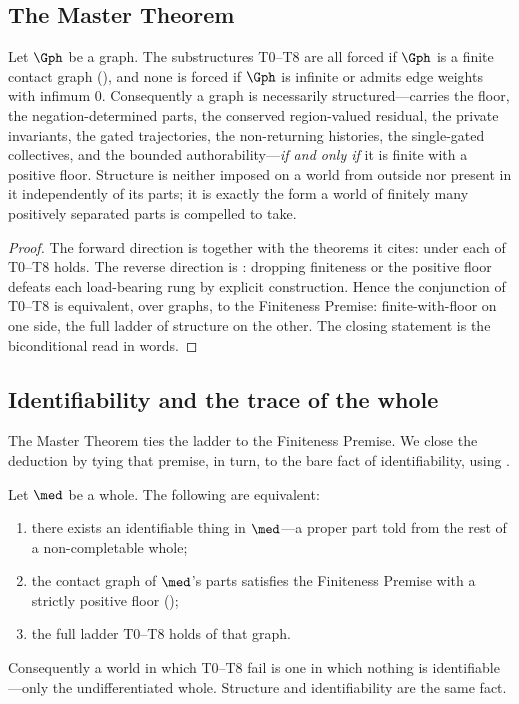 \subsection{The Master Theorem}

\begin{theorem}
\label{thm:master}
Let $\Gph$ be a graph. The substructures T0--T8 are all forced if $\Gph$ is a
finite contact graph \textup{(}\textup{)}, and none is forced if
$\Gph$ is infinite or admits edge weights with infimum $0$. Consequently a graph
is necessarily structured---carries the floor, the negation-determined parts, the
conserved region-valued residual, the private invariants, the gated trajectories,
the non-returning histories, the single-gated collectives, and the bounded
authorability---\emph{if and only if} it is finite with a positive floor. Structure
is neither imposed on a world from outside nor present in it independently of its
parts; it is exactly the form a world of finitely many positively separated parts
is compelled to take.
\end{theorem}

\begin{proof}
The forward direction is  together with the theorems it
cites: under  each of T0--T8 holds. The reverse direction is
: dropping finiteness or the positive floor defeats each
load-bearing rung by explicit construction. Hence the conjunction of T0--T8 is
equivalent, over graphs, to the Finiteness Premise: finite-with-floor on one
side, the full ladder of structure on the other. The closing statement is the
biconditional read in words.
\end{proof}

\subsection{Identifiability and the trace of the whole}

The Master Theorem ties the ladder to the Finiteness Premise. We close the
deduction by tying that premise, in turn, to the bare fact of identifiability,
using .

\begin{theorem}
\label{thm:identifiability}
Let $\med$ be a whole. The following are equivalent:
\begin{enumerate}[label=\textup{(\roman*)},leftmargin=2.2em]
\item there exists an identifiable thing in $\med$---a proper part told from the
rest of a non-completable whole;
\item the contact graph of $\med$'s parts satisfies the Finiteness Premise with a
strictly positive floor \textup{(}\textup{)};
\item the full ladder T0--T8 holds of that graph.
\end{enumerate}
Consequently a world in which T0--T8 fail is one in which nothing is
identifiable---only the undifferentiated whole. Structure and identifiability are
the same fact.
\end{theorem}


